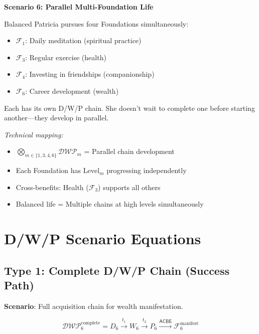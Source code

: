 \documentclass[11pt,twoside]{book}
\newcommand{\Foundations}{\mathcal{F}}
\newcommand{\ACBE}{\mathsf{ACBE}}
\newcommand{\DWP}{\mathcal{DWP}}
\begin{document}
\begin{tcolorbox}[colback=yellow!5!white,colframe=yellow!65!black,title=\textbf{Real-Life Scenarios: D/W/P Chains},breakable]
\textbf{Scenario 6: Parallel Multi-Foundation Life}

Balanced Patricia pursues four Foundations simultaneously:
\begin{itemize}
    \item $\Foundations_1$: Daily meditation (spiritual practice)
    \item $\Foundations_3$: Regular exercise (health)
    \item $\Foundations_4$: Investing in friendships (companionship)
    \item $\Foundations_6$: Career development (wealth)
\end{itemize}

Each has its own D/W/P chain. She doesn't wait to complete one before starting another---they develop in parallel.

\textit{Technical mapping:}
\begin{itemize}
    \item $\bigotimes_{m \in \{1,3,4,6\}} \DWP_m$ = Parallel chain development
    \item Each Foundation has $\mathrm{Level}_m$ progressing independently
    \item Cross-benefits: Health ($\Foundations_3$) supports all others
    \item Balanced life = Multiple chains at high levels simultaneously
\end{itemize}

\end{tcolorbox}

\section{D/W/P Scenario Equations}

\subsection{Type 1: Complete D/W/P Chain (Success Path)}

\textbf{Scenario}: Full acquisition chain for wealth manifestation.

\begin{equation}
\boxed{
    \DWP_6^{\mathrm{complete}} = D_6 \xrightarrow{t_1} W_6 \xrightarrow{t_2} P_6
    \xrightarrow{\ACBE} \Foundations_6^{\mathrm{manifest}}
}
\end{equation}
\end{document}
